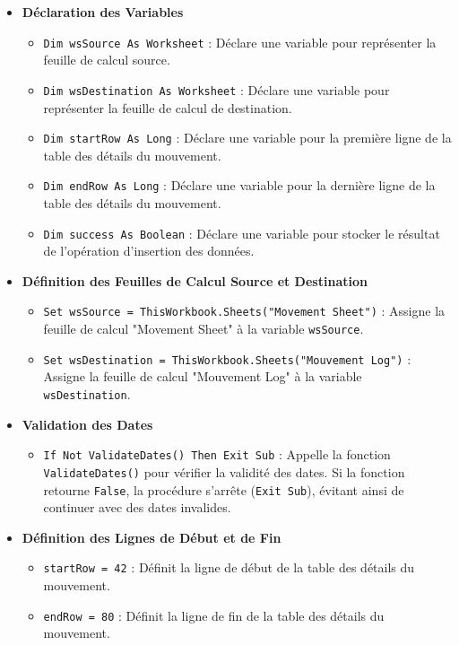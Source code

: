 \documentclass[a4paper, oneside, 12pt, final]{extreport}
\begin{document}
\begin{itemize}
    \item \textbf{Déclaration des Variables}
    \begin{itemize}
        \item \texttt{Dim wsSource As Worksheet} : Déclare une variable pour représenter la feuille de calcul source.
        \item \texttt{Dim wsDestination As Worksheet} : Déclare une variable pour représenter la feuille de calcul de destination.
        \item \texttt{Dim startRow As Long} : Déclare une variable pour la première ligne de la table des détails du mouvement.
        \item \texttt{Dim endRow As Long} : Déclare une variable pour la dernière ligne de la table des détails du mouvement.
        \item \texttt{Dim success As Boolean} : Déclare une variable pour stocker le résultat de l'opération d'insertion des données.
    \end{itemize}

    \item \textbf{Définition des Feuilles de Calcul Source et Destination}
    \begin{itemize}
        \item \texttt{Set wsSource = ThisWorkbook.Sheets("Movement Sheet")} : Assigne la feuille de calcul "Movement Sheet" à la variable \texttt{wsSource}.
        \item \texttt{Set wsDestination = ThisWorkbook.Sheets("Mouvement Log")} : Assigne la feuille de calcul "Mouvement Log" à la variable \texttt{wsDestination}.
    \end{itemize}

    \item \textbf{Validation des Dates}
    \begin{itemize}
        \item \texttt{If Not ValidateDates() Then Exit Sub} : Appelle la fonction \texttt{ValidateDates()} pour vérifier la validité des dates. Si la fonction retourne \texttt{False}, la procédure s'arrête (\texttt{Exit Sub}), évitant ainsi de continuer avec des dates invalides.
    \end{itemize}

    \item \textbf{Définition des Lignes de Début et de Fin}
    \begin{itemize}
        \item \texttt{startRow = 42} : Définit la ligne de début de la table des détails du mouvement.
        \item \texttt{endRow = 80} : Définit la ligne de fin de la table des détails du mouvement.
    \end{itemize}


\end{itemize}
\end{document}
